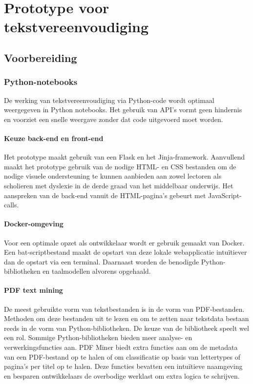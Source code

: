 \chapter{Prototype voor tekstvereenvoudiging}

\section{Voorbereiding}

\subsection{Python-notebooks}

De werking van tekstvereenvoudiging via Python-code wordt optimaal weergegeven in Python notebooks. Het gebruik van API's vormt geen hindernis en voorziet een snelle weergave zonder dat code uitgevoerd moet worden. 

\subsubsection{Keuze back-end en front-end}

Het prototype maakt gebruik van een Flask en het Jinja-framework. Aanvullend maakt het prototype gebruik van de nodige HTML- en CSS bestanden om de nodige visuele ondersteuning te kunnen aanbieden aan zowel lectoren als scholieren met dyslexie in de derde graad van het middelbaar onderwijs. Het aanspreken van de back-end vanuit de HTML-pagina's gebeurt met JavaScript-calls.

\subsubsection{Docker-omgeving}

Voor een optimale opzet als ontwikkelaar wordt er gebruik gemaakt van Docker. Een bat-scriptbestand maakt de opstart van deze lokale webapplicatie intuïtiever dan de opstart via een terminal. Daarnaast worden de benodigde Python-bibliotheken en taalmodellen alvorens opgehaald.

\subsubsection{PDF text mining}

De meest gebruikte vorm van tekstbestanden is in de vorm van PDF-bestanden. Methoden om deze bestanden uit te lezen en om te zetten naar tekstdata bestaan reeds in de vorm van Python-bibliotheken. De keuze van de bibliotheek speelt wel een rol. Sommige Python-bibliotheken bieden meer analyse- en verwerkingsfuncties aan. PDF Miner biedt extra functies aan om de metadata van een PDF-bestand op te halen of om classificatie op basis van lettertypes of pagina's per titel op te halen. Deze functies bevatten een intuïtieve naamgeving en besparen ontwikkelaars de overbodige werklast om extra logica te schrijven.

